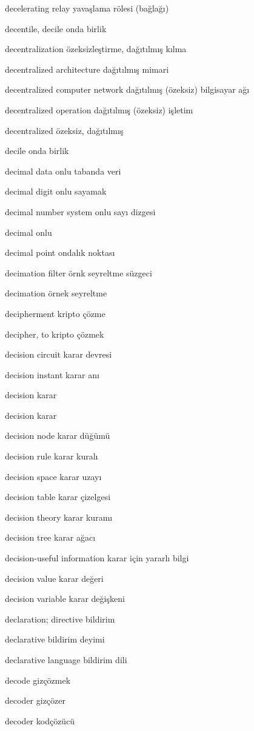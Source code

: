 \documentclass[12pt,fleqn]{article}\usepackage{../../common}
\begin{document}
decelerating relay yavaşlama rölesi (bağlağı)

decentile, decile onda birlik

decentralization özeksizleştirme, dağıtılmış kılma

decentralized architecture dağıtılmış mimari

decentralized computer network dağıtılmış (özeksiz) bilgisayar ağı

decentralized operation dağıtılmış (özeksiz) işletim

decentralized özeksiz, dağıtılmış

decile onda birlik

decimal data onlu tabanda veri

decimal digit onlu sayamak

decimal number system onlu sayı dizgesi

decimal onlu

decimal point ondalık noktası

decimation filter örnk seyreltme süzgeci

decimation örnek seyreltme

decipherment kripto çözme

decipher, to kripto çözmek

decision circuit karar devresi

decision instant karar anı

decision karar

decision karar

decision node karar düğümü

decision rule karar kuralı

decision space karar uzayı

decision table karar çizelgesi

decision theory karar kuramı

decision tree karar ağacı

decision-useful information karar için yararlı bilgi

decision value karar değeri

decision variable karar değişkeni

declaration; directive bildirim

declarative bildirim deyimi

declarative language bildirim dili

decode gizçözmek

decoder gizçözer

decoder kodçözücü
\end{document}
